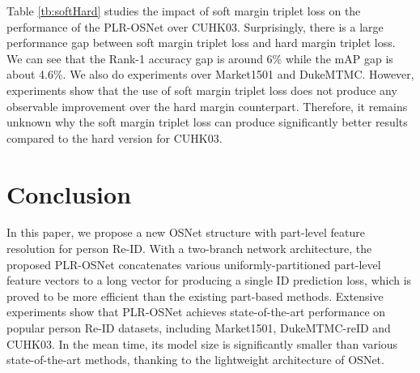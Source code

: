 \documentclass[journal]{IEEEtran}
\begin{document}
Table \ref{tb:softHard} studies the impact of soft margin triplet loss on the performance of the PLR-OSNet over CUHK03. Surprisingly, there is a large performance gap between soft margin triplet loss and hard margin triplet loss. We can see that the Rank-1 accuracy gap is around 6\% while the mAP gap is about 4.6\%. We also do experiments over Market1501 and DukeMTMC. However, experiments show that the use of soft margin triplet loss does not produce any observable improvement over the hard margin counterpart. Therefore, it remains unknown why the soft margin triplet loss can produce significantly better results compared to the hard version for CUHK03.

\section{Conclusion}
In this paper, we propose a new OSNet structure with part-level feature resolution for person Re-ID. With a two-branch network architecture, the proposed PLR-OSNet concatenates various uniformly-partitioned part-level feature vectors to a long vector for producing a single ID prediction loss, which is proved to be more efficient than the existing part-based methods.  Extensive experiments show that PLR-OSNet achieves state-of-the-art performance on popular person Re-ID datasets, including Market1501, DukeMTMC-reID and CUHK03. In the mean time, its model size is significantly smaller than various state-of-the-art methods, thanking to the lightweight architecture of OSNet.
\end{document}
